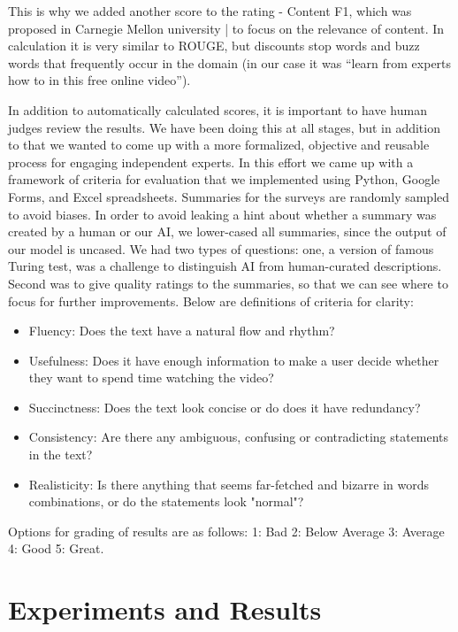 \documentclass{article}
\begin{document}
This is why we added another score to the rating -  Content F1, which was proposed in Carnegie Mellon university | to focus on the relevance of content. In calculation it is very similar to ROUGE, but discounts stop words and buzz words that frequently occur in the domain (in our case it was “learn from experts how to in this free online video”).  

In addition to automatically calculated scores, it is important to have human judges review the results. We have been doing this at all stages, but in addition to that we wanted to come up with a more formalized, objective and reusable process for engaging independent experts. In this effort we came up with a framework of criteria for evaluation that we implemented using Python, Google Forms, and Excel spreadsheets. Summaries for the surveys are randomly sampled to avoid biases.  In order to avoid leaking a hint about whether a summary was created by a human or our AI, we lower-cased all summaries, since the output of our model is uncased. We had two types of questions: one, a version of famous Turing test, was a challenge to distinguish AI from human-curated descriptions. Second was to give quality ratings to the summaries, so that we can see where to focus for further improvements. Below are definitions of criteria for clarity:
\begin{itemize}

\item Fluency: Does the text have a natural flow and rhythm?
\item Usefulness: Does it have enough information to make a user decide whether they want to spend time watching the video?
\item Succinctness: Does the text look concise or do does it have redundancy?
\item Consistency: Are there any ambiguous, confusing or contradicting statements in the text?
\item Realisticity: Is there anything that seems far-fetched and bizarre in words combinations, or do the statements look "normal"?

\end{itemize}

Options for grading of results are as follows: 1: Bad   2: Below Average   3: Average   4: Good   5: Great.


\section{Experiments and Results}
\end{document}
